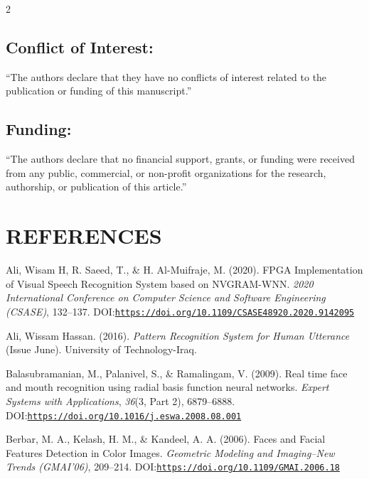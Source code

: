 \documentclass[9pt]{extarticle}
\begin{document}
\begin{multicols}{2}
\subsection*{Conflict of Interest:}
“The authors declare that they have no conflicts of interest related to the publication or funding of this manuscript.”

\subsection*{Funding:}
“The authors declare that no financial support, grants, or funding were received from any public, commercial, or non-profit organizations for the research, authorship, or publication of this article.”

\section*{REFERENCES}
\begin{list}{}{
    \setlength{\leftmargin}{1.5em}
    \setlength{\itemindent}{-1.5em}
    \setlength{\parsep}{0pt}
    \setlength{\itemsep}{6pt}
}
\item \hypertarget{ref:1}{}Ali, Wisam H, R. Saeed, T., \& H. Al-Muifraje, M. (2020). FPGA Implementation of Visual Speech Recognition System based on NVGRAM-WNN. \textit{2020 International Conference on Computer Science and Software Engineering (CSASE)}, 132–137. DOI:\href{https://doi.org/10.1109/CSASE48920.2020.9142095}{{\nolinkurl{https://doi.org/10.1109/CSASE48920.2020.9142095}}}

\item \hypertarget{ref:2}{}Ali, Wissam Hassan. (2016). \textit{Pattern Recognition System for Human Utterance} (Issue June). University of Technology-Iraq.

\item \hypertarget{ref:3}{}Balasubramanian, M., Palanivel, S., \& Ramalingam, V. (2009). Real time face and mouth recognition using radial basis function neural networks. \textit{Expert Systems with Applications}, \textit{36}(3, Part 2), 6879–6888. DOI:\href{https://doi.org/10.1016/j.eswa.2008.08.001}{{\nolinkurl{https://doi.org/10.1016/j.eswa.2008.08.001}}}

\item \hypertarget{ref:4}{}Berbar, M. A., Kelash, H. M., \& Kandeel, A. A. (2006). Faces and Facial Features Detection in Color Images. \textit{Geometric Modeling and Imaging--New Trends (GMAI’06)}, 209–214. DOI:\href{https://doi.org/10.1109/GMAI.2006.18}{{\nolinkurl{https://doi.org/10.1109/GMAI.2006.18}}}


\end{list}
\end{multicols}
\end{document}
